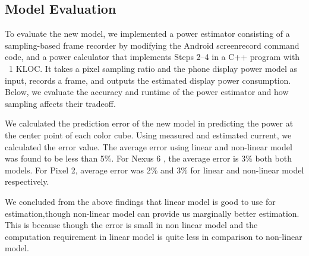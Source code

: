 \subsection{Model Evaluation}
\label{sec:evaluation}

To evaluate the new model,
we implemented a power estimator consisting of
a sampling-based frame recorder
by modifying the Android screenrecord command code,
and a power calculator that implements Steps 2--4 in a C++ program with ~1 KLOC.
It takes a pixel sampling ratio and the phone
display power model as input, records a frame,
and outputs the estimated display power consumption.
Below, we evaluate the accuracy and runtime of the
power estimator 
and how sampling affects their tradeoff.


We calculated the prediction error of the new model
in predicting the power at the center point of each color cube.
Using measured and estimated current, we calculated the error value.
The average error using linear and non-linear model was found to be less
than 5\%. For Nexus 6 , the average error is  3\% both both models. For Pixel 2,
average error was 2\% and 3\% for linear and non-linear model respectively.

We concluded from the above findings that linear model is good to use for
estimation,though non-linear model can provide us marginally better estimation.
This is because though the error is small in non linear model 
and the computation requirement in linear model is quite less in comparison
to non-linear model.
\fi



